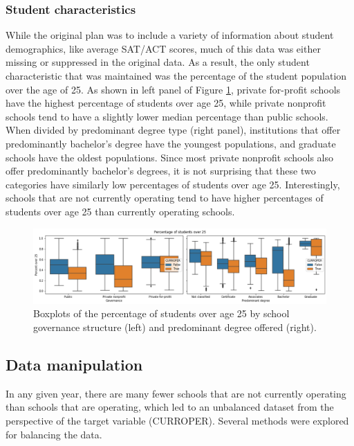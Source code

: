 \documentclass[11pt, letterpaper]{article}
\begin{document}
\subsubsection{Student characteristics}
While the original plan was to include a variety of information about student demographics, like average SAT/ACT scores, much of this data was either missing or suppressed in the original data. As a result, the only student characteristic that was maintained was the percentage of the student population over the age of 25. As shown in left panel of Figure \ref{fig:Age}, private for-profit schools have the highest percentage of students over age 25, while private nonprofit schools tend to have a slightly lower median percentage than public schools. When divided by predominant degree type (right panel), institutions that offer predominantly bachelor's degree have the youngest populations, and graduate schools have the oldest populations. Since most private nonprofit schools also offer predominantly bachelor's degrees, it is not surprising that these two categories have similarly low percentages of students over age 25. Interestingly, schools that are not currently operating tend to have higher percentages of students over age 25 than currently operating schools. 

\begin{figure}[h]
\begin{center}
\includegraphics[width=6.5in]{currentOver25Boxes.png}
\caption{Boxplots of the percentage of students over age 25 by school governance structure (left) and predominant degree offered (right).} 
\label{fig:Age}
\end{center}
\end{figure}

\subsection{Data manipulation}
In any given year, there are many fewer schools that are not currently operating than schools that are operating, which led to an unbalanced dataset from the perspective of the target variable (CURROPER). Several methods were explored for balancing the data.
\end{document}
